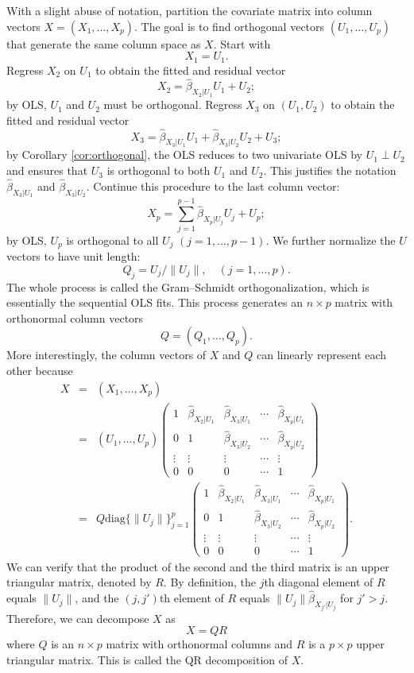 With a slight abuse of notation, partition the covariate matrix into column vectors $X = (X_1, \ldots, X_p)$. The goal is to find orthogonal vectors $(U_1, \ldots, U_p)$ that generate the same column space as $X$. Start with 
$$
X_1 = U_1.
$$ 
Regress $X_2$ on $U_1$ to obtain the fitted and residual vector  
$$
X_2 = \hat{\beta}_{X_2|U_1} U_1  + U_2; 
$$
by OLS, $U_1$ and $U_2$ must be orthogonal. 
Regress $X_3$ on $(U_1, U_2)$ to obtain the fitted and residual vector  
 $$
X_3 = \hat{\beta}_{X_3|U_1} U_1 +   \hat{\beta}_{X_3|U_2} U_2 + U_3; 
$$
by Corollary \ref{cor:orthogonal}, the OLS reduces to two univariate OLS by $U_1 \perp U_2$ and ensures that $U_3$ is orthogonal to both $U_1$ and $U_2$.  This justifies the notation $\hat{\beta}_{X_3|U_1} $ and $\hat{\beta}_{X_3|U_2}$. Continue this procedure to the last column vector:
$$
X_p = \sum_{j=1}^{p-1} \hat{\beta}_{X_p|U_j} U_j + U_p;
$$
by OLS, $U_p$ is orthogonal to all $U_j$ $(j=1,\ldots, p-1)$. We further normalize the $U$ vectors to have unit length:
$$
Q_j = U_j / \|  U_j \|,\quad (j= 1, \ldots, p).
$$
The whole process is called the Gram--Schmidt orthogonalization, which is essentially the sequential OLS fits. This process generates an $n\times p$ matrix with orthonormal column vectors 
$$
Q = (Q_1, \ldots, Q_p). 
$$
More interestingly, the column vectors of $X$ and $Q$ can linearly represent each other because 
\begin{eqnarray*}
X &=&  (X_1, \ldots, X_p) \\
&=& (U_1, \ldots, U_p) \begin{pmatrix}
1 & \hat{\beta}_{X_2|U_1} & \hat{\beta}_{X_3|U_1} &\cdots & \hat{\beta}_{X_p|U_1} \\
0& 1& \hat{\beta}_{X_3|U_2} &\cdots & \hat{\beta}_{X_p|U_2} \\
\vdots & \vdots & \vdots & \cdots & \vdots \\
0&0&0& \cdots & 1
\end{pmatrix} \\
&=& Q
\text{diag}\{ \|  U_j \| \}_{j=1}^p
\begin{pmatrix}
1 & \hat{\beta}_{X_2|U_1} & \hat{\beta}_{X_3|U_1} &\cdots & \hat{\beta}_{X_p|U_1} \\
0& 1& \hat{\beta}_{X_3|U_2} &\cdots & \hat{\beta}_{X_p|U_2} \\
\vdots & \vdots & \vdots & \cdots & \vdots \\
0&0&0& \cdots & 1
\end{pmatrix}  . 
\end{eqnarray*}
We can verify that the product of the second and the third matrix is an upper triangular matrix, denoted by $R$. By definition, the $j$th diagonal element of $R$ equals $\|  U_j \|$, and the $(j, j')$th element of $R$ equals $\|  U_j \|  \hat{\beta}_{X_{j'}|U_j} $ for $j' > j.$
Therefore, we can decompose $X$ as
$$
X = QR
$$
where $Q$ is an $n\times p$ matrix with orthonormal columns and $R$ is a $p\times p$ upper triangular matrix. This is called the QR decomposition of $X$. 



